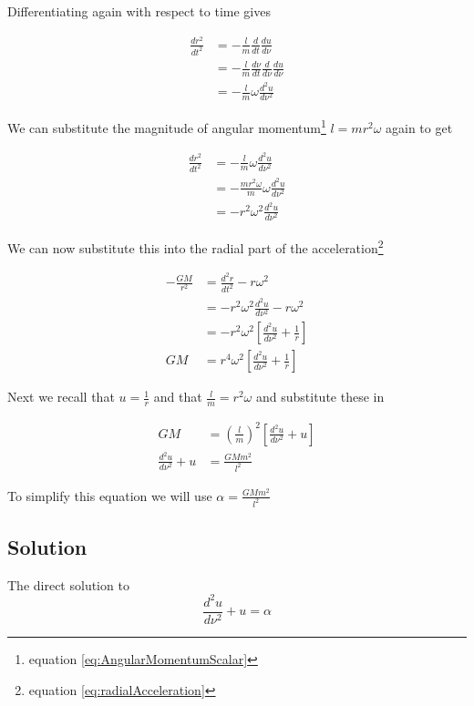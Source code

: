 Differentiating again with respect to time gives

\begin{align}
\frac{dr^2}{dt^2}&= -\frac{l}{m}\frac{d}{dt}\frac{du}{d\nu} \nonumber \\
&= -\frac{l}{m}\frac{d\nu}{dt}\frac{d}{d\nu}\frac{du}{d\nu}\nonumber \\
&= -\frac{l}{m}\omega\frac{d^2u}{d\nu^2}
\end{align}

We can substitute the magnitude of angular momentum\footnote{equation \ref{eq:AngularMomentumScalar}} $l=mr^2\omega$ again to get

\begin{align}
\frac{dr^2}{dt^2}&= -\frac{l}{m}\omega\frac{d^2u}{d\nu^2} \nonumber \\
&= -\frac{mr^2\omega}{m}\omega\frac{d^2u}{d\nu^2} \nonumber \\
&= -r^2\omega^2\frac{d^2u}{d\nu^2}
\end{align}

We can now substitute this into the radial part of the acceleration\footnote{equation \ref{eq:radialAcceleration}}

\begin{align}
-\frac{GM}{r^2}&= \frac{ d^2 r}{d t^2} -r \omega^2  \nonumber \\
&=-r^2\omega^2\frac{d^2u}{d\nu^2} -r\omega^2 \nonumber \\
&=-r^2\omega^2\left[\frac{d^2u}{d\nu^2}+\frac{1}{r}\right] \nonumber \\
GM&=r^4\omega^2\left[\frac{d^2u}{d\nu^2}+\frac{1}{r}\right]
\end{align}

Next we recall that $u=\frac{1}{r}$ and that $\frac{l}{m}=r^2\omega$ and substitute these in

\begin{align}
GM&=\left(\frac{l}{m}\right)^2\left[\frac{d^2u}{d\nu^2}+u\right] \nonumber\\
\frac{d^2u}{d\nu^2}+u &=\frac{GMm^2}{l^2}
\end{align}

To simplify this equation we will use $\alpha=\frac{GMm^2}{l^2}$

\subsection{Solution}

The direct solution to
\begin{equation}
\frac{d^2u}{d\nu^2}+u =\alpha
\end{equation}

